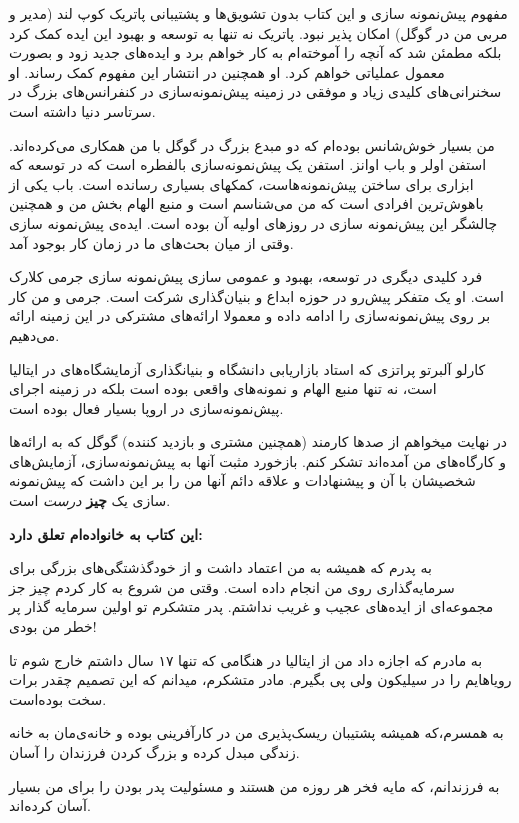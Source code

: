 مفهوم پیش‌نمونه سازی و این کتاب بدون تشویق‌ها و پشتیبانی پاتریک کوپ لند
(مدیر و مربی من در گوگل) امکان پذیر نبود. پاتریک نه تنها به توسعه و
بهبود این ایده کمک کرد بلکه مطمئن شد که آنچه را آموخته‌ام به کار خواهم
برد و ایده‌های جدید زود و بصورت معمول عملیاتی خواهم کرد. او همچنین در
انتشار این مفهوم کمک رساند. او سخنرانی‌‌های کلیدی زیاد و موفقی در زمینه
پیش‌نمونه‌سازی در کنفرانس‌های بزرگ در سرتاسر دنیا داشته است.

من بسیار خوش‌شانس بوده‌ام که دو مبدع بزرگ در گوگل با من همکاری
می‌کرده‌اند. استفن اولر و باب اوانز. استفن یک پیش‌نمونه‌سازی بالفطره است
که در توسعه  که ابزاری برای ساختن پیش‌نمونه‌هاست، کمکهای
بسیاری رسانده است. باب یکی از باهوش‌ترین افرادی است که من می‌شناسم است و
منبع الهام بخش من و همچنین چالشگر این پیش‌نمونه سازی در روزهای اولیه آن
بوده است. ایده‌ی پیش‌نمونه سازی وقتی از میان بحث‌های ما در زمان کار
بوجود آمد.

فرد کلیدی دیگری در توسعه، بهبود و عمومی سازی پیش‌نمونه سازی جرمی کلارک
است. او یک متفکر پیش‌رو در حوزه ابداع و بنیان‌گذاری شرکت  است.
جرمی و من کار بر روی پیش‌نمونه‌سازی را ادامه داده و معمولا ارائه‌های
مشترکی در این زمینه ارائه می‌دهیم.

کارلو آلبرتو پراتزی که استاد بازاریابی دانشگاه   و
بنیانگذاری آزمایشگاه‌های  در ایتالیا است، نه تنها منبع
الهام و نمونه‌های واقعی بوده است بلکه در زمینه اجرای پیش‌نمونه‌سازی در
اروپا بسیار فعال بوده است.

در نهایت میخواهم از صدها کارمند (همچنین مشتری و بازدید کننده) گوگل که به
ارائه‌ها و کارگاه‌های من آمده‌اند تشکر کنم. بازخورد مثبت آنها به
پیش‌نمونه‌سازی، آزمایش‌های شخصیشان با آن و پیشنهادات و علاقه دائم آنها
من را بر این داشت که پیش‌نمونه سازی یک \textbf{چیز} \emph{درست} است.

\textbf{این کتاب به خانواده‌ام تعلق دارد:}

به پدرم که همیشه به من اعتماد داشت و از خودگذشتگی‌های بزرگی برای
سرمایه‌گذاری روی من انجام داده است. وقتی من شروع به کار کردم چیز جز
مجموعه‌ای از ایده‌های عجیب و غریب نداشتم. پدر متشکرم تو اولین سرمایه
گذار پر خطر من بودی!

به مادرم که اجازه داد من از ایتالیا در هنگامی که تنها ۱۷ سال داشتم خارج
شوم تا رویاهایم را در سیلیکون ولی پی بگیرم. مادر متشکرم، میدانم که این
تصمیم چقدر برات سخت بوده‌است.

به همسرم،که همیشه پشتیبان ریسک‌پذیری من در کارآفرینی بوده و خانه‌ی‌مان
به خانه زندگی مبدل کرده و بزرگ کردن فرزندان را آسان.

به فرزندانم، که مایه فخر هر روزه من هستند و مسئولیت پدر بودن را برای من
بسیار آسان کرده‌اند.
